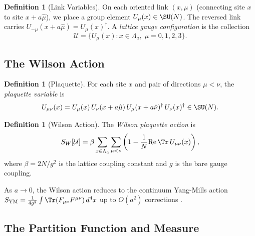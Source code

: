 \documentclass[12pt, a4paper]{article}
\theoremstyle{plain}
\theoremstyle{definition}
\newtheorem{definition}[theorem]{Definition}
\begin{document}
\begin{definition}[Link Variables]\label{def:links}
  On each oriented link $(x, \mu)$ (connecting site $x$ to site $x + a\hat{\mu}$),
  we place a group element $U_\mu(x) \in \SU(N)$. The reversed link carries
  $U_{-\mu}(x + a\hat{\mu}) = U_\mu(x)^\dagger$. A \emph{lattice gauge
  configuration} is the collection
  \begin{equation}
    \mathcal{U} = \{U_\mu(x) : x \in \Lambda_a, \; \mu = 0,1,2,3\}.
  \end{equation}
\end{definition}

\subsection{The Wilson Action}

\begin{definition}[Plaquette]\label{def:plaquette}
  For each site $x$ and pair of directions $\mu < \nu$, the
  \emph{plaquette variable} is
  \begin{equation}\label{eq:plaquette}
    U_{\mu\nu}(x) = U_\mu(x) \, U_\nu(x + a\hat{\mu}) \,
    U_\mu(x + a\hat{\nu})^\dagger \, U_\nu(x)^\dagger \in \SU(N).
  \end{equation}
\end{definition}

\begin{definition}[Wilson Action]\label{def:wilson_action}
  The \emph{Wilson plaquette action} is
  \begin{equation}\label{eq:wilson_action}
    S_W[\mathcal{U}] = \beta \sum_{x \in \Lambda_a} \sum_{\mu < \nu}
    \left(1 - \frac{1}{N} \mathrm{Re}\, \Tr\, U_{\mu\nu}(x)\right),
  \end{equation}
  where $\beta = 2N/g^2$ is the lattice coupling constant and $g$ is the
  bare gauge coupling.
\end{definition}

\begin{remark}
  As $a \to 0$, the Wilson action reduces to the continuum Yang-Mills action
  $S_{\text{YM}} = \frac{1}{4g^2}\int \Tr(F_{\mu\nu} F^{\mu\nu})\,d^4x$
  up to $O(a^2)$ corrections \citep{Wilson1974, CreutzBook}.
\end{remark}

\subsection{The Partition Function and Measure}
\end{document}
